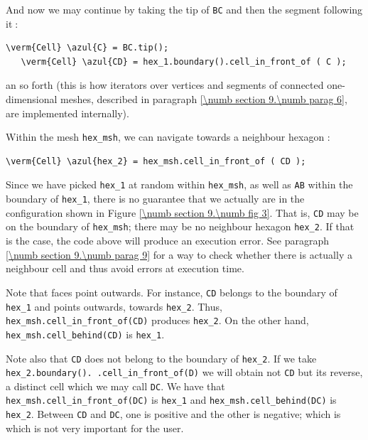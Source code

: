 And now we may continue by taking the tip of {\small\tt BC} and then the segment
following it$\;$:

\begin{Verbatim}[commandchars=\\\{\},formatcom=\small\tt,
   baselinestretch=0.94,framesep=2mm                      ]
   \verm{Cell} \azul{C} = BC.tip();
   \verm{Cell} \azul{CD} = hex_1.boundary().cell_in_front_of ( C );
\end{Verbatim}

\noindent an so forth (this is how iterators over vertices and segments of connected
one-dimensional meshes, described in paragraph \ref{\numb section 9.\numb parag 6},
are implemented internally).

Within the mesh {\small\tt hex\_msh}, we can navigate towards a neighbour hexagon :

\begin{Verbatim}[commandchars=\\\{\},formatcom=\small\tt,
   baselinestretch=0.94,framesep=2mm                      ]
   \verm{Cell} \azul{hex_2} = hex_msh.cell_in_front_of ( CD );
\end{Verbatim}

Since we have picked {\small\tt hex\_1} at random within {\small\tt hex\_msh},
as well as {\small\tt AB} within the boundary of {\small\tt hex\_1},
there is no guarantee that we actually are in the configuration shown in
Figure \ref{\numb section 9.\numb fig 3}.
That is, {\small\tt CD} may be on the boundary of {\small\tt hex\_msh};
there may be no neighbour hexagon {\small\tt hex\_2}.
If that is the case, the code above will produce an execution error.
See paragraph \ref{\numb section 9.\numb parag 9} for a way to check whether there is actually
a neighbour cell and thus avoid errors at execution time.

Note that faces point outwards.
For instance, {\small\tt CD} belongs to the boundary of {\small\tt hex\_1} and points
outwards, towards {\small\tt hex\_2}.
Thus, {\small\tt hex\_msh.cell\_in\_front\_of(CD)} produces {\small\tt hex\_2}.
On the other hand, {\small\tt hex\_msh.cell\_behind(CD)} is {\small\tt hex\_1}.

Note also that {\small\tt CD} does not belong to the boundary of {\small\tt hex\_2}.
If we take {\small\tt hex\_2.boundary(). .cell\_in\_front\_of(D)} we will obtain not
{\small\tt CD} but its reverse, a distinct cell which we may call {\small\tt DC}.
We have that {\small\tt hex\_msh.cell\_in\_front\_of(DC)} is {\small\tt hex\_1} and
{\small\tt hex\_msh.cell\_behind(DC)} is {\small\tt hex\_2}.
Between {\small\tt CD} and {\small\tt DC}, one is positive and the other is negative;
which is which is not very important for the user.


